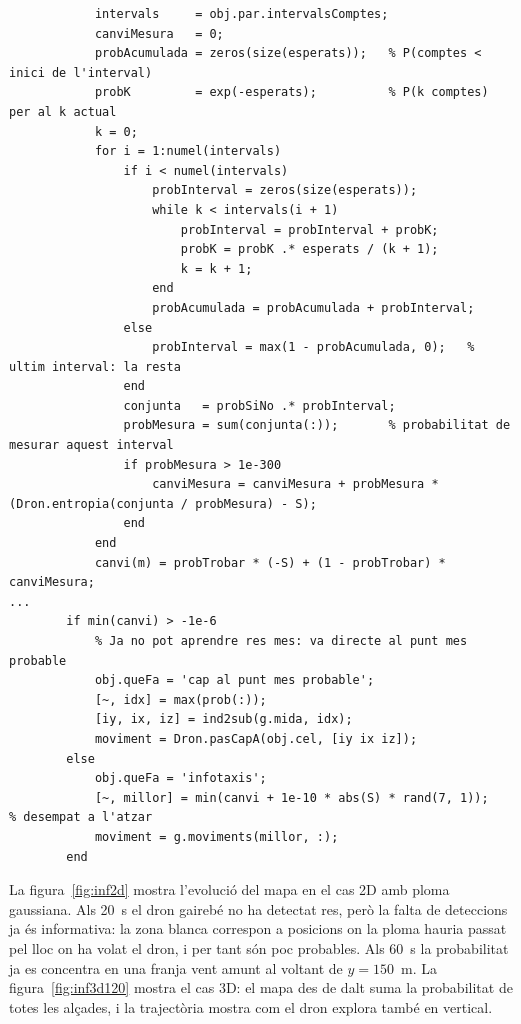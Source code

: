 \documentclass[11pt,a4paper]{article}
\begin{document}
\begin{lstlisting}[caption={Probabilitats per intervals i decisió final (part de \texttt{Dron.infotaxisDecidir}).}, label=lst:decidir]
            % Recorrem k = 0, 1, 2... sumant la llei de Poisson interval a interval
            intervals     = obj.par.intervalsComptes;
            canviMesura   = 0;
            probAcumulada = zeros(size(esperats));   % P(comptes < inici de l'interval)
            probK         = exp(-esperats);          % P(k comptes) per al k actual
            k = 0;
            for i = 1:numel(intervals)
                if i < numel(intervals)
                    probInterval = zeros(size(esperats));
                    while k < intervals(i + 1)
                        probInterval = probInterval + probK;
                        probK = probK .* esperats / (k + 1);
                        k = k + 1;
                    end
                    probAcumulada = probAcumulada + probInterval;
                else
                    probInterval = max(1 - probAcumulada, 0);   % ultim interval: la resta
                end
                conjunta   = probSiNo .* probInterval;
                probMesura = sum(conjunta(:));       % probabilitat de mesurar aquest interval
                if probMesura > 1e-300
                    canviMesura = canviMesura + probMesura * (Dron.entropia(conjunta / probMesura) - S);
                end
            end
            canvi(m) = probTrobar * (-S) + (1 - probTrobar) * canviMesura;
...
        if min(canvi) > -1e-6
            % Ja no pot aprendre res mes: va directe al punt mes probable
            obj.queFa = 'cap al punt mes probable';
            [~, idx] = max(prob(:));
            [iy, ix, iz] = ind2sub(g.mida, idx);
            moviment = Dron.pasCapA(obj.cel, [iy ix iz]);
        else
            obj.queFa = 'infotaxis';
            [~, millor] = min(canvi + 1e-10 * abs(S) * rand(7, 1));   % desempat a l'atzar
            moviment = g.moviments(millor, :);
        end
\end{lstlisting}

La figura~\ref{fig:inf2d} mostra l'evolució del mapa en el cas 2D amb ploma gaussiana. Als 20~s el dron gairebé no ha detectat res, però la falta de deteccions ja és informativa: la zona blanca correspon a posicions on la ploma hauria passat pel lloc on ha volat el dron, i per tant són poc probables. Als 60~s la probabilitat ja es concentra en una franja vent amunt al voltant de $y = 150$~m. La figura~\ref{fig:inf3d120} mostra el cas 3D: el mapa des de dalt suma la probabilitat de totes les alçades, i la trajectòria mostra com el dron explora també en vertical.
\end{document}
